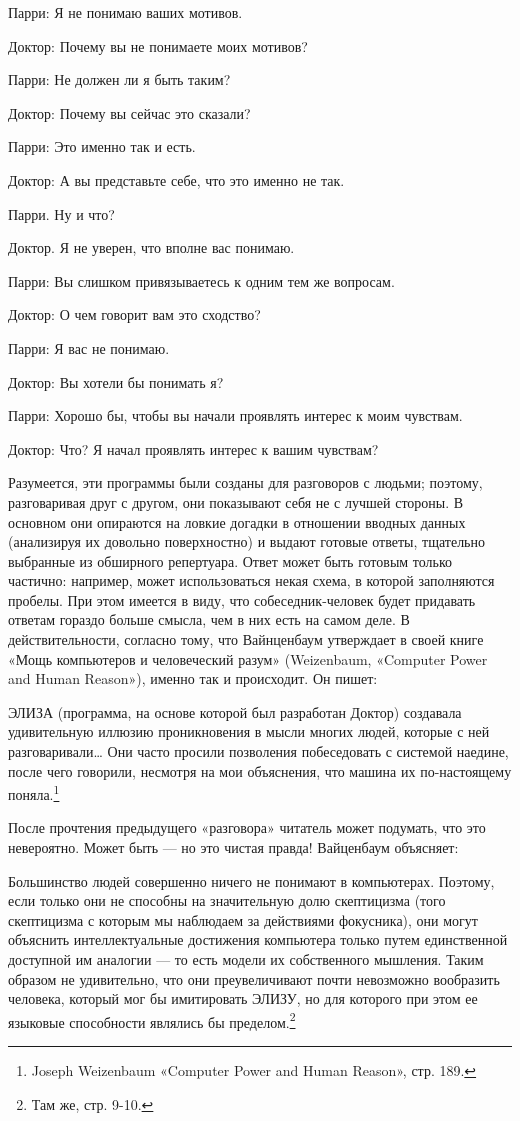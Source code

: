 Парри: Я не понимаю ваших мотивов.

Доктор: Почему вы не понимаете моих мотивов?

Парри: Не должен ли я быть таким?

Доктор: Почему вы сейчас это сказали?

Парри: Это именно так и есть.

Доктор: А вы представьте себе, что это именно не так.

Парри. Ну и что?

Доктор. Я не уверен, что вполне вас понимаю.

Парри: Вы слишком привязываетесь к одним тем же вопросам.

Доктор: О чем говорит вам это сходство?

Парри: Я вас не понимаю.

Доктор: Вы хотели бы понимать я?

Парри: Хорошо бы, чтобы вы начали проявлять интерес к моим чувствам.

Доктор: Что? Я начал проявлять интерес к вашим чувствам?

Разумеется, эти программы были созданы для разговоров с людьми; поэтому, разговаривая друг с другом, они показывают себя не с лучшей стороны. В основном они опираются на ловкие догадки в отношении вводных данных (анализируя их довольно поверхностно) и выдают готовые ответы, тщательно выбранные из обширного репертуара. Ответ может быть готовым только частично: например, может использоваться некая схема, в которой заполняются пробелы. При этом имеется в виду, что собеседник-человек будет придавать ответам гораздо больше смысла, чем в них есть на самом деле. В действительности, согласно тому, что Вайнценбаум утверждает в своей книге «Мощь компьютеров и человеческий разум» (Weizenbaum, «Computer Power and Human Reason»), именно так и происходит. Он пишет:

ЭЛИЗА (программа, на основе которой был разработан Доктор) создавала удивительную иллюзию проникновения в мысли многих людей, которые с ней разговаривали\ldots{} Они часто просили позволения побеседовать с системой наедине, после чего говорили, несмотря на мои объяснения, что машина их по-настоящему поняла.\footnote{Joseph Weizenbaum «Computer Power and Human Reason», стр. 189.}

После прочтения предыдущего «разговора» читатель может подумать, что это невероятно. Может быть --- но это чистая правда! Вайценбаум объясняет:

Большинство людей совершенно ничего не понимают в компьютерах. Поэтому, если только они не способны на значительную долю скептицизма (того скептицизма с которым мы наблюдаем за действиями фокусника), они могут объяснить интеллектуальные достижения компьютера только путем единственной доступной им аналогии --- то есть модели их собственного мышления. Таким образом не удивительно, что они преувеличивают почти невозможно вообразить человека, который мог бы имитировать ЭЛИЗУ, но для которого при этом ее языковые способности являлись бы пределом.\footnote{Там же, стр. 9-10.}


